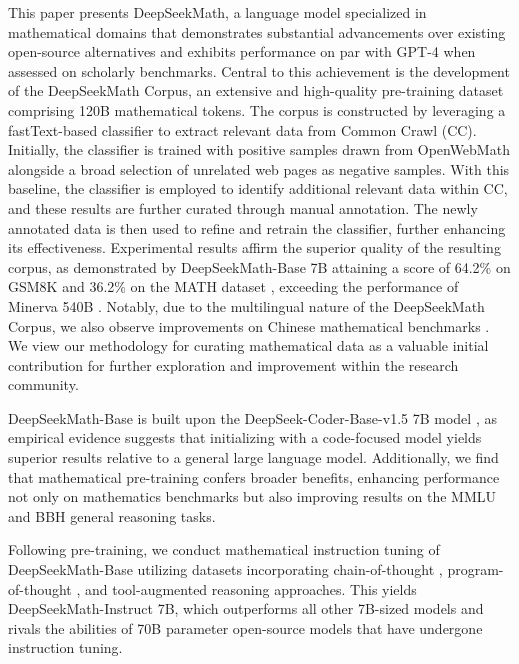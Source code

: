 This paper presents DeepSeekMath, a language model specialized in mathematical domains that demonstrates substantial advancements over existing open-source alternatives and exhibits performance on par with GPT-4 when assessed on scholarly benchmarks. Central to this achievement is the development of the DeepSeekMath Corpus, an extensive and high-quality pre-training dataset comprising 120B mathematical tokens. The corpus is constructed by leveraging a fastText-based classifier \citep{joulin2016fasttext} to extract relevant data from Common Crawl (CC). Initially, the classifier is trained with positive samples drawn from OpenWebMath \citep{openwebmath} alongside a broad selection of unrelated web pages as negative samples. With this baseline, the classifier is employed to identify additional relevant data within CC, and these results are further curated through manual annotation. The newly annotated data is then used to refine and retrain the classifier, further enhancing its effectiveness. Experimental results affirm the superior quality of the resulting corpus, as demonstrated by DeepSeekMath-Base 7B attaining a score of 64.2\% on GSM8K \citep{gsm8k} and 36.2\% on the MATH dataset \citep{MATH}, exceeding the performance of Minerva 540B \citep{minerva}. Notably, due to the multilingual nature of the DeepSeekMath Corpus, we also observe improvements on Chinese mathematical benchmarks \citep{wei2023cmath,agieval}. We view our methodology for curating mathematical data as a valuable initial contribution for further exploration and improvement within the research community.

DeepSeekMath-Base is built upon the DeepSeek-Coder-Base-v1.5 7B model \citep{deepseek-coder}, as empirical evidence suggests that initializing with a code-focused model yields superior results relative to a general large language model. Additionally, we find that mathematical pre-training confers broader benefits, enhancing performance not only on mathematics benchmarks but also improving results on the MMLU \citep{mmlu} and BBH \citep{bbh} general reasoning tasks.

Following pre-training, we conduct mathematical instruction tuning of DeepSeekMath-Base utilizing datasets incorporating chain-of-thought \citep{cot}, program-of-thought \citep{pot,pal}, and tool-augmented reasoning \citep{tora} approaches. This yields DeepSeekMath-Instruct 7B, which outperforms all other 7B-sized models and rivals the abilities of 70B parameter open-source models that have undergone instruction tuning.

